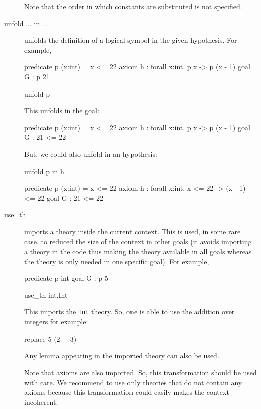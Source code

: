 \begin{description}
Note that the order in which constants are substituted is not specified.


\item[unfold ... in ...] unfolds the definition of a logical symbol in the
  given hypothesis.
  For example,
\begin{whycode}
predicate p (x:int) = x <= 22
axiom h : forall x:int. p x -> p (x - 1)
goal G : p 21
\end{whycode}

\begin{transwhy3}
unfold p
\end{transwhy3}

This unfolds  in the goal:

\begin{whycode}
predicate p (x:int) = x <= 22
axiom h : forall x:int. p x -> p (x - 1)
goal G : 21 <= 22
\end{whycode}

But, we could also unfold in an hypothesis:

\begin{transwhy3}
unfold p in h
\end{transwhy3}

\begin{whycode}
predicate p (x:int) = x <= 22
axiom h : forall x:int. x <= 22 -> (x - 1) <= 22
goal G : 21 <= 22
\end{whycode}



\item[use\_th] imports a theory inside the current context. This is used, in
  some rare case, to reduced the size of the context in other goals (it avoids
  importing a theory in the \whyml code thus making the theory available in all
  goals whereas the theory is only needed in one specific goal).
  For example,
\begin{whycode}
predicate p int
goal G : p 5
\end{whycode}

\begin{transwhy3}
use_th int.Int
\end{transwhy3}

This imports the \texttt{Int} theory. So, one is able to use the addition over
integers for example:

\begin{transwhy3}
replace 5 (2 + 3)
\end{transwhy3}

Any lemma appearing in the imported theory can also be used.

Note that axioms are also imported. So, this transformation should be used
with care. We recommend to use only theories that do not contain any axioms
because this transformation could easily makes the context incoherent.


\end{description}

